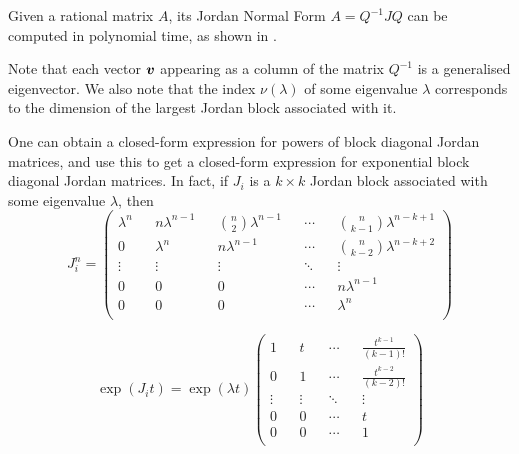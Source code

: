 Given a rational matrix $A$, its Jordan Normal Form $A=Q^{-1}JQ$ can be
computed in polynomial time, as shown in \cite{Cai94}.

Note that each vector $\boldsymbol{v}$ appearing as a column of the
matrix $Q^{-1}$ is a generalised eigenvector. We also note that the
index $\nu(\lambda)$ of some eigenvalue $\lambda$ corresponds to the
dimension of the largest Jordan block associated with it.

One can obtain a closed-form expression for powers of block diagonal
Jordan matrices, and use this to get a closed-form expression for
exponential block diagonal Jordan matrices. In fact, if $J_{i}$ is a
$k\times k$ Jordan block associated with some eigenvalue $\lambda$,
then
\noindent
\begin{equation*}
J_{i}^{n}=\begin{pmatrix}
\lambda^{n}	&&	n\lambda^{n-1}	&&	{n\choose 2}\lambda^{n-1}	&&
\cdots		&&	{n\choose k-1}\lambda^{n-k+1}				\\
0			&&	\lambda^{n}		&&	n\lambda^{n-1}				&&
\cdots		&&	{n\choose k-2}\lambda^{n-k+2}				\\
\vdots	&&	\vdots	&&	\vdots	&&	\ddots	&&	\vdots			\\
0		&&	0		&&	0		&&	\cdots	&&	n\lambda^{n-1}	\\
0		&&	0		&&	0		&&	\cdots	&&	\lambda^{n}		\\
\end{pmatrix}
\end{equation*}

\begin{equation*}
\exp(J_{i}t)=\exp(\lambda t) \begin{pmatrix}
1		&&	t		&&	\cdots	&&	\frac{t^{k-1}}{(k-1)!}	\\
0		&&	1		&&	\cdots	&&	\frac{t^{k-2}}{(k-2)!}	\\
\vdots	&&	\vdots	&&	\ddots	&&	\vdots						\\
0		&&	0		&&	\cdots	&&	t							\\
0		&&	0		&&	\cdots	&&	1							\\
\end{pmatrix}
\end{equation*}


